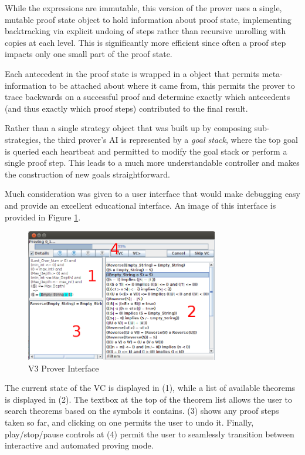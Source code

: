 While the expressions are immutable, this version of the prover uses a single, mutable proof state object to hold information about proof state, implementing backtracking via explicit undoing of steps rather than recursive unrolling with copies at each level.  This is significantly more efficient since often a proof step impacts only one small part of the proof state.

Each antecedent in the proof state is wrapped in a object that permits meta-information to be attached about where it came from, this permits the prover to trace backwards on a successful proof and determine exactly which antecedents (and thus exactly which proof steps) contributed to the final result.

Rather than a single strategy object that was built up by composing sub-strategies, the third prover's AI is represented by a \emph{goal stack}, where the top goal is queried each heartbeat and permitted to modify the goal stack or perform a single proof step.  This leads to a much more understandable controller and makes the construction of new goals straightforward.

Much consideration was given to a user interface that would make debugging easy and provide an excellent educational interface.  An image of this interface is provided in Figure \ref{newProverInterface}.

\begin{figure}
  \centering
    \includegraphics[width=0.75\textwidth]{newProverInterface}
  \caption{V3 Prover Interface\label{newProverInterface}}
\end{figure}

The current state of the VC is displayed in (1), while a list of available theorems is displayed in (2).  The textbox at the top of the theorem list allows the user to search theorems based on the symbols it contains.  (3) shows any proof steps taken so far, and clicking on one permits the user to undo it.  Finally, play/stop/pause controls at (4) permit the user to seamlessly transition between interactive and automated proving mode.


